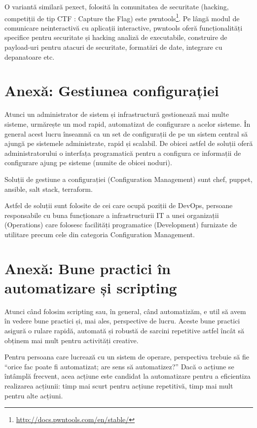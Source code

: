 O variantă similară pexect, folosită în comunitatea de securitate (hacking,
competiții de tip CTF : Capture the Flag) este
pwntools\footnote{\url{http://docs.pwntools.com/en/stable/}}. Pe lângă modul de
comunicare neinteractivă cu aplicații interactive, pwntools oferă
funcționalități specifice pentru securitate și hacking analiză de executabile,
construire de payload-uri pentru atacuri de securitate, formatări de date,
integrare cu depanatoare etc.

\section{Anexă: Gestiunea configurației}
\label{sec:script-conf}

Atunci un administrator de sistem și infrastructură gestionează mai multe
sisteme, urmărește un mod rapid, automatizat de configurare a acelor sisteme. În
general acest lucru înseamnă ca un set de configurații de pe un sistem central
să ajungă pe sistemele administrate, rapid și scalabil. De obicei astfel de
soluții oferă administratorului o interfața programatică pentru a configura ce
informații de configurare ajung pe sisteme (numite de obicei noduri).

Soluții de gestiune a configurației (Configuration Management) sunt chef,
puppet, ansible, salt stack, terraform.

Astfel de soluții sunt folosite de cei care ocupă poziții de DevOps, persoane
responsabile cu buna funcționare a infrastructurii IT a unei organizații
(Operations) care folosesc facilități programatice (Development) furnizate de
utilitare precum cele din categoria Configuration Management.

\section{Anexă: Bune practici în automatizare și scripting}
\label{sec:script-good}

Atunci când folosim scripting sau, în general, când automatizăm, e util să avem
în vedere bune practici și, mai ales, perspective de lucru. Aceste bune practici
asigură o rulare rapidă, automată și robustă de sarcini repetitive astfel încât
să obținem mai mult pentru activități creative.

Pentru persoana care lucrează cu un sistem de operare, perspectiva trebuie să
fie “orice fac poate fi automatizat; are sens să automatizez?” Dacă o acțiune se
întâmplă frecvent, acea acțiune este candidat la automatizare pentru a
eficientiza realizarea acțiunii: timp mai scurt pentru acțiune repetitivă, timp
mai mult pentru alte acțiuni.

